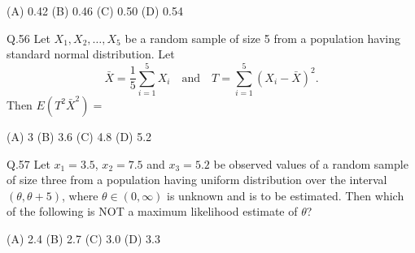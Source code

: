 \documentclass{article}
\begin{document}
																																																																																																								   (A) 0.42 \hspace{2cm} (B) 0.46 \hspace{2cm} (C) 0.50 \hspace{2cm} (D) 0.54

																																																																																																								   \vspace{0.5cm}

																																																																																																								   Q.56 \quad Let $X_1, X_2, \ldots, X_5$ be a random sample of size 5 from a population having standard normal distribution. Let
																																																																																																								   \[
																																																																																																								   \bar{X} = \frac{1}{5} \sum_{i=1}^{5} X_i \quad \text{and} \quad T = \sum_{i=1}^{5} (X_i - \bar{X})^2.
																																																																																																								   \]
																																																																																																								   Then $E(T^2 \bar{X}^2) =$

																																																																																																								   (A) 3 \hspace{2cm} (B) 3.6 \hspace{2cm} (C) 4.8 \hspace{2cm} (D) 5.2

																																																																																																								   \vspace{0.5cm}

																																																																																																								   Q.57 \quad Let $x_1 = 3.5$, $x_2 = 7.5$ and $x_3 = 5.2$ be observed values of a random sample of size three from a population having uniform distribution over the interval $(\theta, \theta + 5)$, where $\theta \in (0, \infty)$ is unknown and is to be estimated. Then which of the following is NOT a maximum likelihood estimate of $\theta$?

																																																																																																								   (A) 2.4 \hspace{2cm} (B) 2.7 \hspace{2cm} (C) 3.0 \hspace{2cm} (D) 3.3
\end{document}
